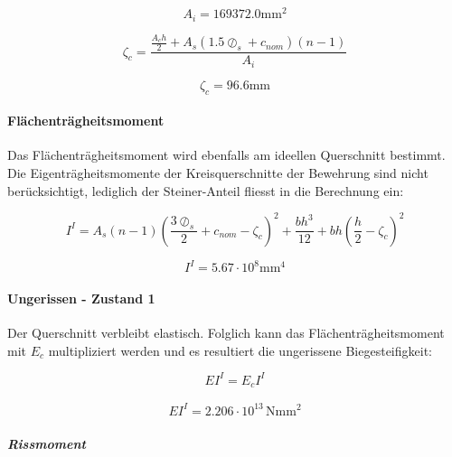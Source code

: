 \documentclass[
  12pt,
  letterpaper,
  egregdoesnotlikesansseriftitles]{scrreprt}
\let\oldparagraph\paragraph
\renewcommand{\paragraph}[1]{\oldparagraph{#1}\mbox{}}
\let\oldsubparagraph\subparagraph
\renewcommand{\subparagraph}[1]{\oldsubparagraph{#1}\mbox{}}
\begin{document}
\begin{equation}A_{i} = 169372.0 \text{mm}^{2}\end{equation}

\begin{equation}\zeta_{c} = \frac{\frac{A_{c} h}{2} + A_{s} \left(1.5 \oslash_{s} + c_{nom}\right) \left(n - 1\right)}{A_{i}}\end{equation}

\begin{equation}\zeta_{c} = 96.6 \text{mm}\end{equation}

\hypertarget{fluxe4chentruxe4gheitsmoment}{%
\paragraph{Flächenträgheitsmoment}\label{fluxe4chentruxe4gheitsmoment}}

Das Flächenträgheitsmoment wird ebenfalls am ideellen Querschnitt
bestimmt. Die Eigenträgheitsmomente der Kreisquerschnitte der Bewehrung
sind nicht berücksichtigt, lediglich der Steiner-Anteil fliesst in die
Berechnung ein:

\begin{equation}I^{I} = A_{s} \left(n - 1\right) \left(\frac{3 \oslash_{s}}{2} + c_{nom} - \zeta_{c}\right)^{2} + \frac{b h^{3}}{12} + b h \left(\frac{h}{2} - \zeta_{c}\right)^{2}\end{equation}

\begin{equation}I^{I} = 5.67 \cdot 10^{8} \text{mm}^{4}\end{equation}

\hypertarget{ungerissen---zustand-1}{%
\paragraph{Ungerissen - Zustand 1}\label{ungerissen---zustand-1}}

Der Querschnitt verbleibt elastisch. Folglich kann das
Flächenträgheitsmoment mit \(E_c\) multipliziert werden und es
resultiert die ungerissene Biegesteifigkeit:

\begin{equation}EI^{I} = E_{c} I^{I}\end{equation}

\begin{align}EI^{I} = 2.206 \cdot 10^{13} \, \mathrm{Nmm^2} \end{align}

\hypertarget{rissmoment}{%
\subparagraph{Rissmoment}\label{rissmoment}}
\end{document}
